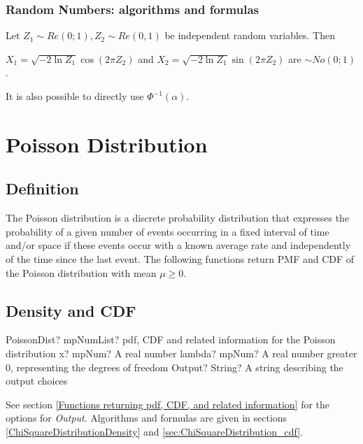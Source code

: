 \subsubsection{Random Numbers: algorithms and formulas}
Let $Z_1 \sim Re(0;1), Z_2 \sim Re(0,1)$ be independent random variables. Then

\vspace{0.3cm}
$X_1 = \sqrt{-2 \ln Z_1} \cos(2 \pi Z_2)$ and $X_2 = \sqrt{-2 \ln Z_1} \sin(2 \pi Z_2)$ are $\sim No(0;1)$.


\vspace{0.3cm}
It is also possible to directly use $\Phi^{-1}(\alpha)$.




\newpage
\section{Poisson Distribution}
\label{PoissonDistribution}

\subsection{Definition}
The Poisson distribution is a discrete probability distribution that expresses the probability of a given number of events occurring in a fixed interval of time and/or space if these events occur with a known average rate and independently of the time since the last event.
The following functions return PMF and CDF of the Poisson distribution with mean $\mu \geq 0$.



\subsection{Density and CDF}

\begin{mpFunctionsExtract}
	\mpFunctionThreeNotImplemented
	{PoissonDist? mpNumList? pdf, CDF and related information for the Poisson distribution}
	{x? mpNum? A real number}
	{lambda? mpNum? A real number greater 0, representing the degrees of freedom}
	{Output? String? A string describing the output choices}
\end{mpFunctionsExtract}


\vspace{0.3cm}
See section \ref{Functions returning pdf, CDF, and related information} for the options for {\itshape\sffamily Output}. Algorithms and formulas are given in sections \ref{ChiSquareDistributionDensity} and \ref{sec:ChiSquareDistribution_cdf}.



